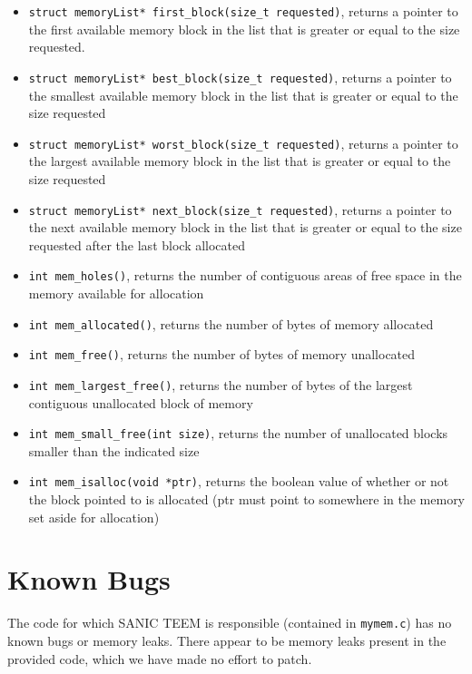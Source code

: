 \documentclass[paper=a4, fontsize=11pt]{scrartcl}
\begin{document}
\begin{itemize}
  \item \texttt{struct memoryList* first_block(size_t requested)}, returns a pointer to the first available memory block in the list that is greater or equal to the size requested.
  \item \texttt{struct memoryList* best_block(size_t requested)}, returns a pointer to the smallest available memory block in the list that is greater or equal to the size requested
  \item \texttt{struct memoryList* worst_block(size_t requested)}, returns a pointer to the largest available memory block in the list that is greater or equal to the size requested
  \item \texttt{struct memoryList* next_block(size_t requested)}, returns a pointer to the next available memory block in the list that is greater or equal to the size requested after the last block allocated
  \item \texttt{int mem_holes()}, returns the number of contiguous areas of free space in the memory available for allocation
  \item \texttt{int mem_allocated()}, returns the number of bytes of memory allocated
  \item \texttt{int mem_free()}, returns the number of bytes of memory unallocated
  \item \texttt{int mem_largest_free()}, returns the number of bytes of the largest contiguous unallocated block of memory
  \item \texttt{int mem_small_free(int size)}, returns the number of unallocated blocks smaller than the indicated size
  \item \texttt{int mem_isalloc(void *ptr)}, returns the boolean value of whether or not the block pointed to is allocated (ptr must point to somewhere in the memory set aside for allocation)
    
\end{itemize}

\section*{Known Bugs}
The code for which SANIC TEEM is responsible (contained in \texttt{mymem.c}) has no known bugs or memory leaks. There appear to be memory leaks present in the provided code, which we have made no effort to patch.
\end{document}
